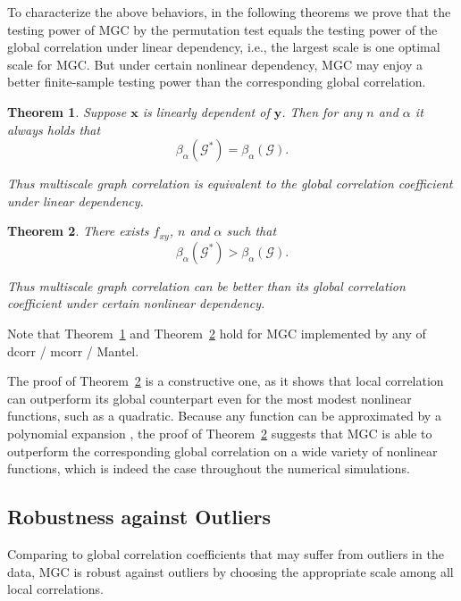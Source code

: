 \documentclass[11pt]{article}
\providecommand{\mb}[1]{\boldsymbol{#1}}
\newcommand{\G}{\mathcal{G}}
\newtheorem{thm}{Theorem}
\begin{document}
To characterize the above behaviors, in the following theorems we prove that the testing power of MGC by the permutation test equals the testing power of the global correlation under linear dependency, i.e., the largest scale is one optimal scale for MGC. But under certain nonlinear dependency, MGC may enjoy a better finite-sample testing power than the corresponding global correlation. 

\begin{thm}
\label{thm2}
Suppose $\mb{x}$ is linearly dependent of $\mb{y}$. Then for any $n$ and $\alpha$ it always holds that
\begin{equation}
\beta_{\alpha}(\G^{*}) = \beta_{\alpha}(\G).
\end{equation}

Thus multiscale graph correlation is equivalent to the global correlation coefficient under linear dependency.
\end{thm}

\begin{thm}
\label{thm3}
There exists $f_{xy}$, $n$ and $\alpha$ such that 
\begin{equation}
\beta_{\alpha}(\G^{*}) > \beta_{\alpha}(\G).
\end{equation}

Thus multiscale graph correlation can be better than its global correlation coefficient under certain nonlinear dependency.
\end{thm}
Note that Theorem~\ref{thm2} and Theorem~\ref{thm3} hold for MGC implemented by any of dcorr / mcorr / Mantel.

The proof of Theorem~\ref{thm3} is a constructive one, as it shows that local correlation can outperform its global counterpart even for the most modest nonlinear functions, such as a quadratic.  Because any function can be approximated by a polynomial expansion \cite{RudinBook}, the proof of Theorem~\ref{thm3} suggests that MGC is able to outperform the corresponding global correlation on a wide variety of nonlinear functions, which is indeed the case throughout the numerical simulations.


\subsection{Robustness against Outliers}
\label{main4}
Comparing to global correlation coefficients that may suffer from outliers in the data, MGC is robust against outliers by choosing the appropriate scale among all local correlations.
\end{document}

